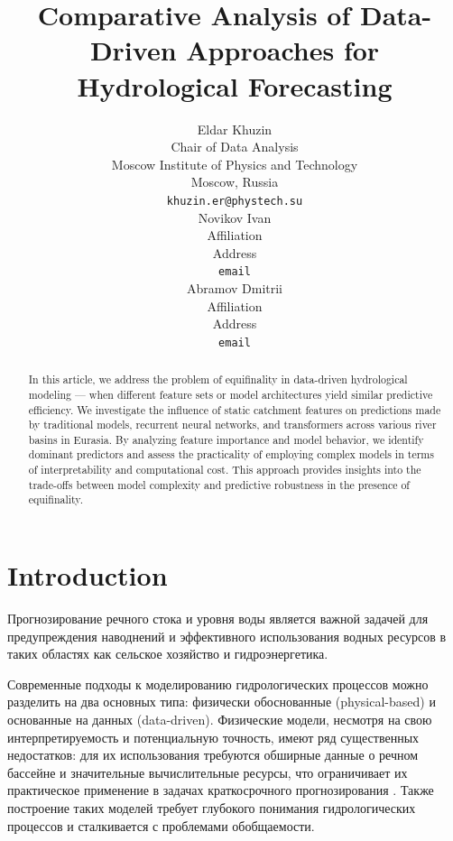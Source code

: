 \documentclass{article}
\title{Comparative Analysis of Data-Driven Approaches for Hydrological Forecasting}
\author{%
    Eldar Khuzin \\
    Chair of Data Analysis\\
    Moscow Institute of Physics and Technology\\
    Moscow, Russia \\
    \texttt{khuzin.er@phystech.su} \\
    \And
    Novikov Ivan \\
    Affiliation \\
    Address \\
    \texttt{email} \\
    \AND
    Abramov Dmitrii \\
    Affiliation \\
    Address \\
    \texttt{email}
}
\date{}
\begin{document}
\sloppy        %
\justifying

\maketitle

\begin{abstract}
    In this article, we address the problem of equifinality in data-driven hydrological modeling — when different feature sets or model architectures yield similar predictive efficiency. We investigate the influence of static catchment features on predictions made by traditional models, recurrent neural networks, and transformers across various river basins in Eurasia. By analyzing feature importance and model behavior, we identify dominant predictors and assess the practicality of employing complex models in terms of interpretability and computational cost. This approach provides insights into the trade-offs between model complexity and predictive robustness in the presence of equifinality.
\end{abstract}



\tableofcontents


\section{Introduction}
\label{sec:introduction}

Прогнозирование речного стока и уровня воды является важной задачей для предупреждения наводнений и эффективного использования водных ресурсов в таких областях как сельское хозяйство и гидроэнергетика.\cite{laversVisionHydrologicalPrediction2020}

Современные подходы к моделированию гидрологических процессов можно разделить на два основных типа: физически обоснованные (physical-based) и основанные на данных (data-driven). Физические модели, несмотря на свою интерпретируемость и потенциальную точность, имеют ряд существенных недостатков: для их использования требуются обширные данные о речном бассейне и значительные вычислительные ресурсы, что ограничивает их практическое применение в задачах краткосрочного прогнозирования \cite{bellosHybridMethodFlood2016}. Также построение таких моделей требует глубокого понимания гидрологических процессов и сталкивается с проблемами обобщаемости.
\end{document}
